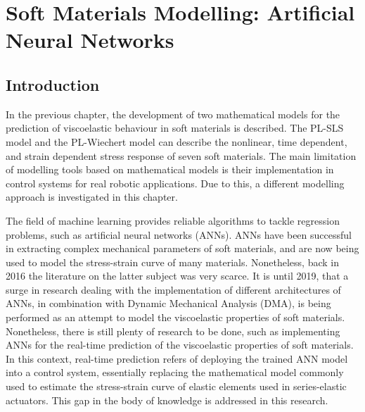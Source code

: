 \chapter{Soft Materials Modelling: Artificial Neural Networks} 
\label{ch6:ANN}

\section{Introduction} 

In the previous chapter, the development of two mathematical models for the prediction of viscoelastic behaviour in soft materials is described. The PL-SLS model and the PL-Wiechert model can describe the nonlinear, time dependent, and strain dependent stress response of seven soft materials. The main limitation of modelling tools based on mathematical models is their implementation in control systems for real robotic applications. Due to this, a different modelling approach is investigated in this chapter.

The field of machine learning provides reliable algorithms to tackle regression problems, such as artificial neural networks (ANNs). ANNs have been successful in extracting complex mechanical parameters of soft materials, and are now being used to model the stress-strain curve of many materials. Nonetheless, back in 2016 the literature on the latter subject was very scarce. It is until 2019, that a surge in research dealing with the implementation of different architectures of ANNs, in combination with Dynamic Mechanical Analysis (DMA), is being performed as an attempt to model the viscoelastic properties of soft materials. Nonetheless, there is still plenty of research to be done, such as implementing ANNs for the real-time prediction of the viscoelastic properties of soft materials. In this context, real-time prediction refers of deploying the trained ANN model into a control system, essentially replacing the mathematical model commonly used to estimate the stress-strain curve of elastic elements used in series-elastic actuators. This gap in the body of knowledge is addressed in this research.


